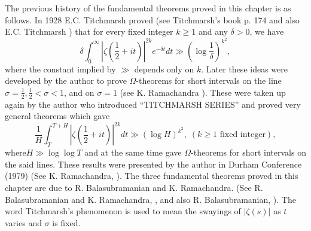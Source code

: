 The previous history of the fundamental theorems proved in this chapter is as follows. In 1928 E.C. Titchmarsh proved (see Titchmarsh's book \cite{Titchmarsh1} p. 174 and also E.C. Titchmarsh \cite{Titchmarsh4}) that for every fixed integer $k \geq 1$ and any $\delta > 0$, we have
$$ 
\delta \int^\infty_0 |\zeta\left(\frac{1}{2} + it \right)|^{2k} e^{-\delta t } dt \gg \left( \log \frac{1}{\delta} \right)^{k^2},
$$
where the constant implied by $\gg$ depends only on $k$. Later these ideas were  developed by the author to prove $\Omega$-theorems for short intervals on the line $\sigma =\frac{1}{2}, \frac{1}{2} <\sigma < 1$, and on $\sigma =1$ (see K. Ramachandra \cite{Ramachandra6}). These were taken up again by the author who introduced ``TITCHMARSH SERIES'' and proved very general theorems which gave
$$
 \frac{1}{H} \int^{T+H}_T |\zeta \left(\frac{1}{2} + it \right)|^{2k} dt \gg (\log H)^{k^2}, \; (k \geq 1 \text{ fixed integer}),
$$
where\pageoriginale $H \gg \log \log T$ and at the same time gave $\Omega$-theorems for short intervals on the said lines. These results were presented by the author in Durham Conference (1979) (See K. Ramachandra, \cite{Ramachandra7}). The three fundamental  theorems proved in this chapter are due to R. Balasubramanian and K. Ramachandra. (See R. Balasubramanian and K. Ramachandra, \cite{Balasubramanian and Ramachandra5}, \cite{Balasubramanian and Ramachandra4} and also R. Balasubramanian, \cite{Balasubramanian1}). The word Titchmarsh's phenomenon is used to mean the swayings of $|\zeta(s)|$ as $t$ varies and $\sigma$ is fixed.
